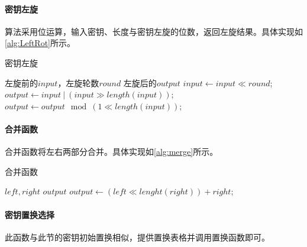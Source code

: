 \documentclass[a4paper, zihao=-4, UTF-8]{ctexart}
\begin{document}
            	\paragraph{密钥左旋} 算法采用位运算，输入密钥、长度与密钥左旋的位数，返回左旋结果。具体实现如\cref{alg:LeftRot}所示。
            	\begin{algorithm}[htbp]
            		\caption{密钥左旋}
            		\label{alg:LeftRot}
            		\begin{algorithmic}[1]
            			\Require 左旋前的$input$，左旋轮数$round$
            			\Ensure 左旋后的$output$
            			\State $input \gets input\ll round$;
            			\State $output \gets input\ |\ (input\gg length(input))$;
            			\State $output \gets output\mod (1\ll length(input))$;
            			\State {}
            			\EndFunction
            		\end{algorithmic}
            	\end{algorithm}
            	\paragraph{合并函数} 合并函数将左右两部分合并。具体实现如\cref{alg:merge}所示。
            	\begin{algorithm}[htbp]
            		\caption{合并函数}
            		\label{alg:merge}
            		\begin{algorithmic}[1]
            			\Require $left, right$
            			\Ensure $output$
            			\State $output\gets (left\ll lenght(right)) + right$;
            			\State {}
            			\EndFunction
            		\end{algorithmic}
            	\end{algorithm}
            	\paragraph{密钥置换选择} 此函数与此节的密钥初始置换相似，提供置换表格并调用置换函数即可。
\end{document}
